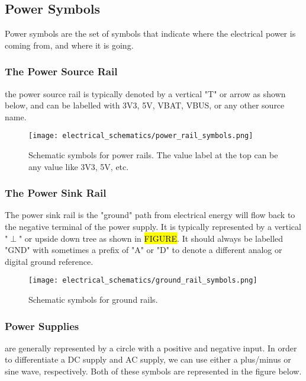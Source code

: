     \subsection{Power Symbols} 
    Power symbols are the set of symbols that indicate where the electrical power is coming from, and where it is going.

        \subsubsection*{The Power Source Rail} 
        the power source rail is typically denoted by a vertical "T" or arrow as shown below, and can be labelled with 3V3,
        5V, VBAT, VBUS, or any other source name.

        \begin{figure}[h!]
            \texttt{[image: electrical\_schematics/power\_rail\_symbols.png]}
            \caption[Power Rail Symbols]{Schematic symbols for power rails.
            The value label at the top can be any value like 3V3, 5V, etc.}
        \end{figure}

        \subsubsection*{The Power Sink Rail} 
        The power sink rail is the "ground" path from electrical energy will flow back to the negative terminal of the power supply. 
        It is typically represented by a vertical "$\perp$" or upside down tree as shown in \hl{FIGURE}.
        It should always be labelled "GND" with sometimes a prefix of "A" or "D" to denote a different analog or digital ground reference.

        \begin{figure}[h!]
            \texttt{[image: electrical\_schematics/ground\_rail\_symbols.png]}
            \caption[Power Rail Symbols]{Schematic symbols for ground rails.}
        \end{figure}

        \subsubsection*{Power Supplies} are generally represented by a circle with a positive and negative input.
        In order to differentiate a DC supply and AC supply, we can use either a plus/minus or sine wave, respectively.
        Both of these symbols are represented in the figure below.

